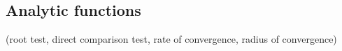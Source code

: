 
\subsection{Analytic functions}

(root test, direct comparison test, rate of convergence, radius of convergence)


